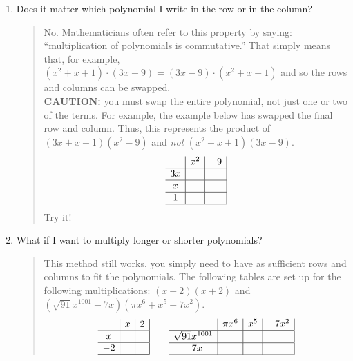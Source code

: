 \documentclass[12pt]{article}
\begin{document}
\begin{enumerate}
\item Does it matter which polynomial I write in the row or in the column?\\
\begin{quote} No.  Mathematicians often refer to this property by saying: ``multiplication 
of polynomials is commutative.''  That simply means that, for example, 
$(x^2+x+1)\cdot(3x-9)=(3x-9)\cdot (x^2+x+1)$ and so the rows and columns can be swapped.\\
\textbf{CAUTION:} you must swap the entire polynomial, not just one or two of the terms.
For example, the example below has swapped the final row and column.  Thus, this represents
the product of $(3x+x+1)(x^2-9)$ and \emph{not} $(x^2+x+1)(3x-9)$.
\begin{equation}
\begin{array}{c|c|c|}
 & x^2 & -9 \\
\hline
3x & & \\
\hline 
x & & \\
\hline 
1 & & \\
\hline
\end{array}
\end{equation}
Try it!
\end{quote}

\item What if I want to multiply longer or shorter polynomials?
\begin{quote}
This method still works, you simply need to have as sufficient rows and columns 
to fit the polynomials.  The following tables are set up for the 
following multiplications: $(x-2)(x+2)$ and $(\sqrt{91}x^{1001}-7x)(\pi x^6+x^5-7x^2)$.
\begin{equation}
\begin{array}{c|c|c|}
 & x & 2\\
\hline
x & & \\
\hline
-2 & & \\
\hline 
\end{array}
\qquad
\begin{array}{c|c|c|c|}
 & \pi x^6 & x^5 & -7x^2 \\
\hline
\sqrt{91}x^{1001} & & & \\
\hline
-7x & & & \\
\hline
\end{array}
\end{equation}
\end{quote}


\end{enumerate}
\end{document}
